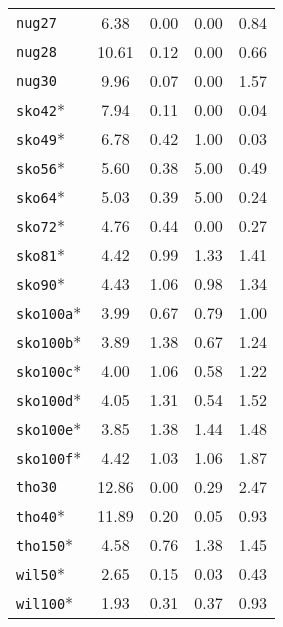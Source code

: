 \begin{table}
\begin{tabular}{l*{4}{S[table-format=2.2]}}
	\texttt{nug27           } &  6.38 &  0.00 &  0.00 &  0.84 \\
	\texttt{nug28           } & 10.61 &  0.12 &  0.00 &  0.66 \\
	\texttt{nug30           } &  9.96 &  0.07 &  0.00 &  1.57 \\
	\texttt{sko42}* &  7.94 &  0.11 &  0.00 &  0.04 \\
	\texttt{sko49}* &  6.78 &  0.42 &  1.00 &  0.03 \\
	\texttt{sko56}* &  5.60 &  0.38 &  5.00 &  0.49 \\
	\texttt{sko64}* &  5.03 &  0.39 &  5.00 &  0.24 \\
	\texttt{sko72}* &  4.76 &  0.44 &  0.00 &  0.27 \\
	\texttt{sko81}* &  4.42 &  0.99 &  1.33 &  1.41 \\
	\texttt{sko90}*&  4.43 &  1.06 &  0.98 &  1.34 \\
	\texttt{sko100a}*&  3.99 &  0.67 &  0.79 &  1.00 \\
	\texttt{sko100b}* &  3.89 &  1.38 &  0.67 &  1.24 \\
	\texttt{sko100c}* &  4.00 &  1.06 &  0.58 &  1.22 \\
	\texttt{sko100d}*&  4.05 &  1.31 &  0.54 &  1.52 \\
	\texttt{sko100e}* &  3.85 &  1.38 &  1.44 &  1.48 \\
	\texttt{sko100f}* &  4.42 &  1.03 &  1.06 &  1.87 \\
	\texttt{tho30           } & 12.86 &  0.00 &  0.29 &  2.47 \\
	\texttt{tho40}*& 11.89 &  0.20 &  0.05 &  0.93 \\
	\texttt{tho150}* &  4.58 &  0.76 &  1.38 &  1.45 \\
	\texttt{wil50}* &  2.65 &  0.15 &  0.03 &  0.43 \\
	\texttt{wil100}* &  1.93 &  0.31 &  0.37 &  0.93 \\
	\bottomrule
\end{tabular}
\end{table}